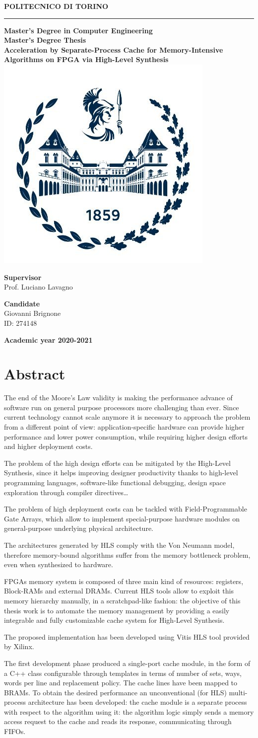 \documentclass[11pt,a4paper]{memoir}
\renewcommand*{\maketitle}%
{
	\newgeometry{left=2cm,right=2cm,top=3cm,bottom=3.5cm}

	\begin{center}
		\begingroup
		{\Huge\textbf{POLITECNICO DI TORINO}}\\[\baselineskip]
		\rule{\textwidth}{2pt}\par
		\vspace*{1em}
		{\LARGE\textbf{Master's Degree in Computer Engineering}}\\[\baselineskip]
		\vspace*{1em}
		{\Large\textbf{Master's Degree Thesis}}\\
		\vspace*{2cm}
		{\huge\textbf{Acceleration by Separate-Process Cache for
		Memory-Intensive Algorithms on FPGA via High-Level Synthesis}}\\
		\vspace*{1cm}
		\includegraphics[width=.3\textwidth]{figures/polito-logo}
	\end{center}
	\vfill
	\begin{minipage}{0.4\textwidth}
		\begin{flushleft}
			{\Large
				\textbf{Supervisor}\\
				Prof. Luciano Lavagno
			}
		\end{flushleft}
	\end{minipage}
	\begin{minipage}{0.4\textwidth}
		\begin{flushright} 
			{\Large
				\textbf{Candidate}\\
				Giovanni Brignone\\
				ID: 274148
			}
		\end{flushright}
	\end{minipage}  
	\vspace*{2cm}
	\begin{center}
		{\Large\textbf{Academic year 2020-2021}}
	\end{center}
	\endgroup

	\restoregeometry 
}
\begin{document}
\pagestyle{empty}
\maketitle

\frontmatter
\chapter*{Abstract}
The end of the Moore's Law validity is making the performance advance of
software run on general purpose processors more challenging than ever.
Since current technology cannot scale anymore it is necessary to approach the
problem from a different point of view: application-specific hardware can
provide higher performance and lower power consumption, while requiring higher
design efforts and higher deployment costs.

The problem of the high design efforts can be mitigated by the High-Level
Synthesis, since it helps improving designer productivity thanks to high-level
programming languages, software-like functional debugging, design space
exploration through compiler directives\ldots

The problem of high deployment costs can be tackled with Field-Programmable
Gate Arrays, which allow to implement special-purpose hardware modules on
general-purpose underlying physical architecture.

\bigskip
The architectures generated by HLS comply with the Von Neumann model, therefore
memory-bound algorithms suffer from the memory bottleneck problem, even when
synthesized to hardware.

FPGAs memory system is composed of three main kind of resources: registers,
Block-RAMs and external DRAMs.
Current HLS tools allow to exploit this memory hierarchy manually, in a
scratchpad-like fashion: the objective of this thesis work is to automate the
memory management by providing a easily integrable and fully customizable cache
system for High-Level Synthesis.

\bigskip
The proposed implementation has been developed using Vitis HLS tool provided
by Xilinx.

The first development phase produced a single-port cache module, in the form of
a C++ class configurable through templates in terms of number of sets, ways,
words per line and replacement policy.
The cache lines have been mapped to BRAMs.
To obtain the desired performance an unconventional (for HLS) multi-process
architecture has been developed: the cache module is a separate process with
respect to the algorithm using it: the algorithm logic simply sends
a memory access request to the cache and reads its response, communicating
through FIFOs.
\end{document}
